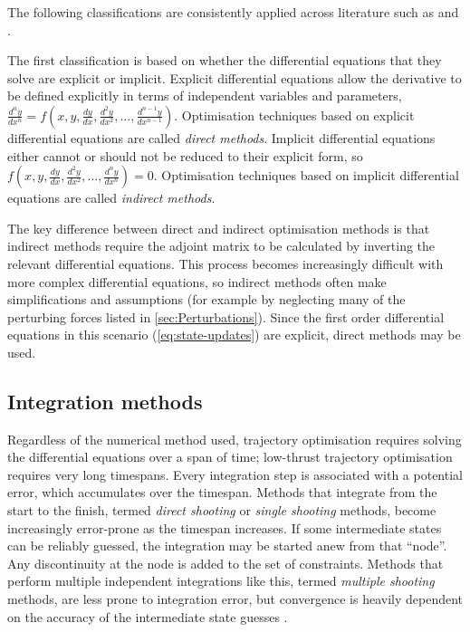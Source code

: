 

 The following classifications are consistently applied across literature such as \textcite{Betts1998} and \textcite{ASTOS_guide}.

The first classification is based on whether the differential equations that they solve are explicit or implicit.
Explicit differential equations allow the derivative to be defined explicitly in terms of independent variables and parameters, $\frac{d^ny}{dx^n}=f(x,y,\frac{dy}{dx},\frac{d^2y}{dx^2},\dots,\frac{d^{n-1}y}{dx^{n-1}})$. Optimisation techniques based on explicit differential equations are called \emph{direct methods}. Implicit differential equations either cannot or should not be reduced to their explicit form, so $f(x,y,\frac{dy}{dx},\frac{d^2y}{dx^2},\dots,\frac{d^{n}y}{dx^{n}})=0$. Optimisation techniques based on implicit differential equations are called \emph{indirect methods}.

The key difference between direct and indirect optimisation methods is that indirect methods require the adjoint matrix to be calculated by inverting the relevant differential equations. This process becomes increasingly difficult with more complex differential equations, so indirect methods often make simplifications and assumptions (for example by neglecting many of the perturbing forces listed in \autoref{sec:Perturbations}). Since the first order differential equations in this scenario (\autoref{eq:state-updates}) are explicit, direct methods may be used.

\subsection{Integration methods}

Regardless of the numerical method used, trajectory optimisation requires solving the differential equations over a span of time; low-thrust trajectory optimisation requires very long timespans. Every integration step is associated with a potential error, which accumulates over the timespan. Methods that integrate from the start to the finish, termed \emph{direct shooting} or \emph{single shooting} methods, become increasingly error-prone as the timespan increases. If some intermediate states can be reliably guessed, the integration may be started anew from that \enquote{node}. Any discontinuity at the node is added to the set of constraints. Methods that perform multiple independent integrations like this, termed \emph{multiple shooting} methods, are less prone to integration error, but convergence is heavily dependent on the accuracy of the intermediate state guesses \parencite{Betts, ASTOS_guide}.

